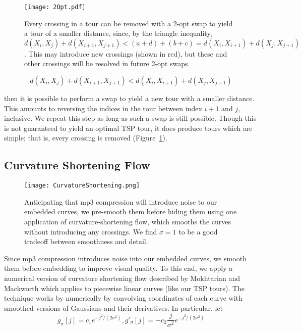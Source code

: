 \documentclass[runningheads]{llncs}
\begin{document}
\begin{figure}
  \centering
  \texttt{[image: 2Opt.pdf]}
  \caption{Every crossing in a tour can be removed with a 2-opt swap to yield a tour of a smaller distance, since, by the triangle inequality, $d(X_i, X_j) + d(X_{i+1}, X_{j+1}) < (a+d) + (b+c) = d(X_i, X_{i+1}) + d(X_j, X_{j+1})$.  This may introduce new crossings (shown in red), but these and other crossings will be resolved in future 2-opt swaps.}
  \label{fig:TwoOpt}
\end{figure}

\begin{equation}
  d(X_i, X_j) + d(X_{i+1}, X_{j+1}) < d(X_i, X_{i+1}) + d(X_j, X_{j+1})
\end{equation}

then it is possible to perform a swap to yield a new tour with a smaller distance.  This amounts to reversing the indices in the tour between index $i+1$ and $j$, inclusive.  We repeat this step as long as such a swap is still possible.  Though this is not guaranteed to yield an optimal TSP tour, it does produce tours which are simple; that is, every crossing is removed (Figure~\ref{fig:TwoOpt}).


\subsection{Curvature Shortening Flow}

\begin{figure}
  \centering
  \texttt{[image: CurvatureShortening.png]}
  \caption{Anticipating that mp3 compression will introduce noise to our embedded curves, we pre-smooth them before hiding them using one application of curvature-shortening flow, which smooths the curves without introducing any crossings.  We find $\sigma=1$ to be a good tradeoff between smoothness and detail.}
  \label{fig:CurvatureShortening}
\end{figure}


Since mp3 compression introduces noise into our embedded curves, we smooth them before embedding to improve visual quality.  To this end, we apply a numerical version of curvature shortening flow described by Mokhtarian and Mackworth \cite{mokhtarian1992theory} which applies to piecewise linear curves (like our TSP tours).  The technique works by numerically by convolving coordinates of each curve with smoothed versions of Gaussians and their derivatives.  In particular, let 
\begin{equation}
  g_{\sigma}[j] = c_1 e^{-j^2 / (2 \sigma^2)}, 
  g'_{\sigma}[j] = - c_2 \frac{j}{\sigma^2} e^{-j^2 / (2 \sigma^2)}
\end{equation}
\end{document}
